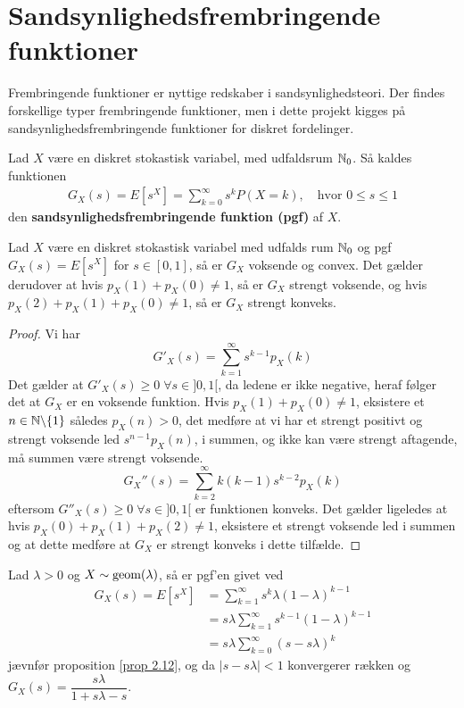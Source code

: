 \section{Sandsynlighedsfrembringende funktioner}
Frembringende funktioner er nyttige redskaber i sandsynlighedsteori. Der findes forskellige typer frembringende funktioner, men i dette projekt kigges på sandsynlighedsfrembringende funktioner for diskret fordelinger. 
\begin{defn} \label{pgf} %
    Lad $X$ være en diskret stokastisk variabel, med udfaldsrum $\mathbb{N}_0$. Så kaldes funktionen
    \begin{align*}
        G_X(s)=E[s^X] = \sum_{k=0}^{\infty}s^k P(X=k), \quad \text{hvor } 0\leq s \leq 1
    \end{align*}
    den \textbf{sandsynlighedsfrembringende funktion (pgf)} af $X$. 
\end{defn}
\begin{cor} \label{cor:egenskaberVedPGF} \label{problem133}
Lad $X$ være en diskret stokastisk variabel med udfalds rum $\mathbb{N}_0$ og pgf $G_X(s) = E[s^X]$ for $s \in [0, 1]$, så er $G_X$ voksende og convex. Det gælder derudover at hvis $p_X(1) + p_X(0) \neq 1$, så er $G_X$ strengt voksende, og hvis $p_X(2) + p_X(1) + p_X(0) \neq 1$, så er $G_X$ strengt konveks.
\end{cor}
\begin{proof}
Vi har 
\begin{equation*}
  G'_X(s) = \sum^\infty_{k = 1} s^{k - 1}p_X(k)
\end{equation*}
Det gælder at $G'_X(s) \geq 0 \; \forall s \in ]0, 1[$, da ledene er ikke negative, heraf følger det at $G_X$ er en voksende funktion. Hvis $p_X(1) + p_X(0) \neq 1$, eksistere et $n \in \mathbb{N} \backslash \{1\}$ således $p_X(n) > 0$, det medføre at vi har et strengt positivt og strengt voksende led $s^{n - 1}p_X(n)$, i summen, og ikke kan være strengt aftagende, må summen være strengt voksende.
\begin{equation*}
    G_X''(s) = \sum^\infty_{k = 2} k(k - 1) s^{k - 2} p_X(k)
\end{equation*}
eftersom $G''_X(s) \geq 0 \; \forall s \in ]0, 1[$ er funktionen konveks. Det gælder ligeledes at hvis $p_X(0) + p_X(1) + p_X(2) \neq 1$, eksistere et strengt voksende led i summen og at dette medføre at $G_X$ er strengt konveks i dette tilfælde. 
\end{proof}

\begin{exmp}\label{ex:geom-pgf}
Lad $\lambda > 0$ og $X\sim\textnormal{geom}(\lambda)$, så er pgf'en givet ved
\begin{align*}
    G_X(s)=E[s^X]&=\sum_{k=1}^\infty s^k \lambda(1-\lambda)^{k-1}\\
    &=s\lambda\sum_{k=1}^\infty s^{k-1}(1-\lambda)^{k-1}\\
    &=s\lambda\sum_{k=0}^\infty (s-s\lambda)^k
\end{align*}
jævnfør proposition \ref{prop 2.12}, og da $|s-s\lambda|<1$ konvergerer rækken og $G_X(s)=\dfrac{s\lambda}{1+s\lambda-s}$.
\end{exmp}

